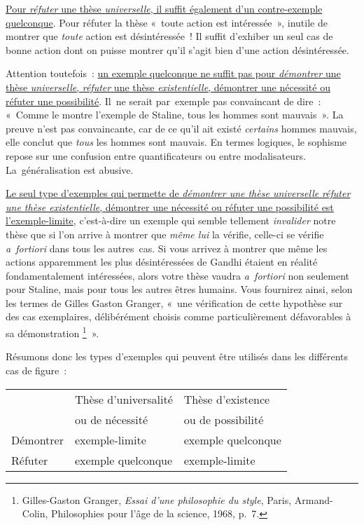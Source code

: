 \documentclass[a4paper,12pt]{report}
\begin{document}
\uline{Pour \emph{réfuter} une thèse \emph{universelle}, il suffit également d'un
contre-exemple quelconque}. Pour réfuter la thèse « toute action est
intéressée », inutile de montrer que \emph{toute} action est désintéressée !
Il suffit d'exhiber un seul cas de bonne action dont on puisse montrer
qu'il s'agit bien d'une action désintéressée.

Attention toutefois : \uline{un exemple quelconque ne suffit pas pour
\emph{démontrer} une thèse \emph{universelle}, \emph{réfuter} une thèse
\emph{existentielle}, démontrer une nécessité ou réfuter une possi\-bilité}.
Il ne serait par exemple pas convaincant de dire : « Comme le montre
l'exemple de Staline, tous les hommes sont mauvais ». La preuve n'est
pas convaincante, car de ce qu'il ait existé \emph{certains} hommes mauvais,
elle conclut que \emph{tous} les hommes sont mauvais. En termes logiques, le
sophisme repose sur une confusion entre quantificateurs ou entre
modalisateurs. La généralisation est abusive.

\uline{Le seul type d'exemples qui permette de \emph{démontrer une thèse
universelle} \emph{réfuter une thèse existentielle}, démontrer une nécessité
ou réfuter une possi\-bilité est l'exemple-limite}, c'est-à-dire un
exemple qui semble tellement \emph{invalider} notre thèse que si l'on arrive
à montrer que \emph{même lui} la vérifie, celle-ci se vérifie \emph{a fortiori}
dans tous les autres cas. Si vous arrivez à montrer que même les actions
apparemment les plus désintéressées de Gandhi étaient en réalité
fondamentalement intéressées, alors votre thèse vaudra \emph{a fortiori} non
seulement pour Staline, mais pour tous les autres êtres humains. Vous
fournirez ainsi, selon les termes de Gilles Gaston Granger, « une
vérification de cette hypothèse sur des cas exemplaires, délibérément
choisis comme particulièrement défavorables à sa démonstration \footnote{Gilles-Gaston Granger, \emph{Essai d'une philosophie du style}, Paris,
Armand-Colin, Philosophies pour l'âge de la science, 1968, p. 7.} ».

Résumons donc les types d'exemples qui peuvent être utilisés dans les
différents cas de figure :
\begin{center}
\begin{tabular}{|l|l|l|}
\hline
 & Thèse d'universalité & Thèse d'existence\\[0pt]
 & ou de nécessité & ou de possibilité\\[0pt]
\hline
Démontrer & exemple-limite & exemple quelconque\\[0pt]
\hline
Réfuter & exemple quelconque & exemple-limite\\[0pt]
\hline
\end{tabular}
\end{center}
\end{document}
